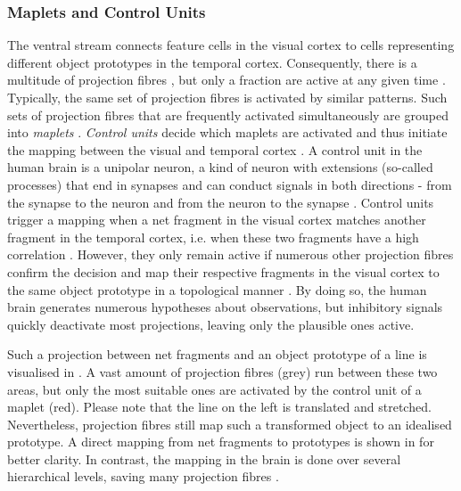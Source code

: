 \subsubsection{Maplets and Control Units}
The ventral stream  connects feature cells in the visual cortex to cells representing different object prototypes in the temporal cortex.  
Consequently, there is a multitude of projection fibres , but only a fraction are active at any given time .
Typically, the same set of projection fibres is activated by similar patterns.
Such sets of projection fibres that are frequently activated simultaneously are grouped into \emph{maplets} .
\emph{Control units} decide which maplets are activated and thus initiate the mapping between the visual and temporal cortex \cite{zhu_maplets_2004}. 
A control unit in the human brain is a unipolar neuron, a kind of neuron with extensions (so-called processes) that end in synapses and can conduct signals in both directions - from the synapse to the neuron and from the neuron to the synapse .
Control units trigger a mapping when a net fragment in the visual cortex matches another fragment in the temporal cortex, i.e. when these two fragments have a high correlation \cite{zhu_maplets_2004}. However, they only remain active if numerous other projection fibres confirm the decision and map their respective fragments in the visual cortex to the same object prototype in a topological manner . By doing so, the human brain generates numerous hypotheses about observations, but inhibitory signals quickly deactivate most projections, leaving only the plausible ones active.

Such a projection between net fragments and an object prototype of a line is visualised in . A vast amount of projection fibres (grey) run between these two areas, but only the most suitable ones are activated by the control unit of a maplet (red).
Please note that the line on the left is translated and stretched. Nevertheless, projection fibres still map such a transformed object to an idealised prototype.
A direct mapping from net fragments to prototypes is shown in  for better clarity. In contrast, the mapping in the brain is done over several hierarchical levels, saving many projection fibres .

